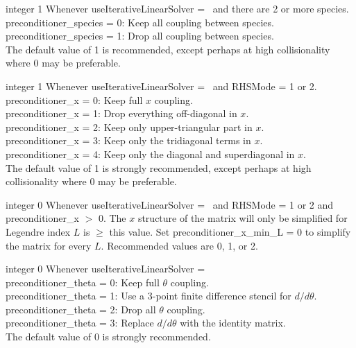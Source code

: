 \myhrule

{integer}
{1}
{Whenever {\ttfamily useIterativeLinearSolver} = \true~and there are 2 or more species.}
{\\
{\ttfamily preconditioner\_species} = 0: Keep all coupling between species.\\

{\ttfamily preconditioner\_species} = 1: Drop all coupling between species.\\

The default value of 1 is recommended, except perhaps at high collisionality where 0 may be preferable.}

\myhrule

{integer}
{1}
{Whenever {\ttfamily useIterativeLinearSolver} = \true~and {\ttfamily RHSMode} = 1 or 2.}
{\\
{\ttfamily preconditioner\_x} = 0: Keep full $x$ coupling.\\

{\ttfamily preconditioner\_x} = 1: Drop everything off-diagonal in $x$.\\

{\ttfamily preconditioner\_x} = 2: Keep only upper-triangular part in $x$.\\

{\ttfamily preconditioner\_x} = 3: Keep only the tridiagonal terms in $x$.\\

{\ttfamily preconditioner\_x} = 4: Keep only the diagonal and superdiagonal in $x$.\\

The default value of 1 is strongly recommended, except perhaps at high collisionality where 0 may be preferable.}

\myhrule

{integer}
{0}
{Whenever {\ttfamily useIterativeLinearSolver} = \true~and {\ttfamily RHSMode} = 1 or 2 and {\ttfamily preconditioner\_x} $>$ 0.}
{The $x$ structure of the matrix will only be simplified for Legendre index $L$ is $\ge$ this value.
Set {\ttfamily preconditioner\_x\_min\_L} = 0 to simplify the matrix for every $L$.
Recommended values are 0, 1, or 2.}

\myhrule

{integer}
{0}
{Whenever {\ttfamily useIterativeLinearSolver} = \true}
{\\
{\ttfamily preconditioner\_theta} = 0: Keep full $\theta$ coupling.\\

{\ttfamily preconditioner\_theta} = 1: Use a 3-point finite difference stencil for $d/d\theta$.\\

{\ttfamily preconditioner\_theta} = 2: Drop all $\theta$ coupling.\\

{\ttfamily preconditioner\_theta} = 3: Replace $d/d\theta$ with the identity matrix.\\

The default value of 0 is strongly recommended.}

